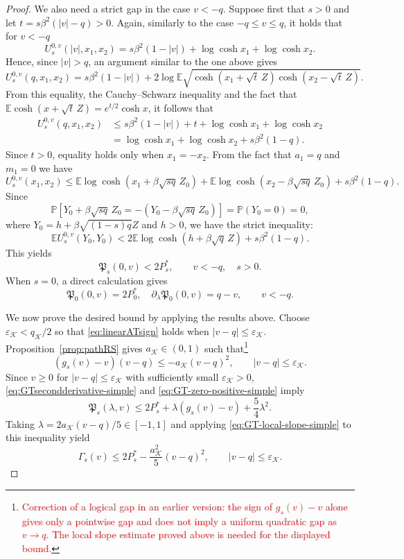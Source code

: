 \documentclass[11pt]{article}
\numberwithin{equation}{section}
\newcommand{\E}{\mathbb{E}}
\newcommand{\Pbb}{\mathbb{P}}
\newcommand{\1}{\mathbf 1}
\newcommand{\cK}{\mathcal K}
\begin{document}
\begin{proof}
We also need a strict gap in  the case $v<-q$.  Suppose first that $s>0$ and let $t=s\beta^2(|v|-q)>0$.
Again, similarly to  the case $-q\le v\le q$, it holds that for $v< -q$
\[
 U_s^{0,v}(|v|,x_1,x_2)
 =s\beta^2(1-|v|)+\log\cosh x_1+\log\cosh x_2.
\]
Hence, since $|v|>q$, an argument similar to the one  above gives  
\[
 U_s^{0,v}(q,x_1,x_2)
 =
 s\beta^2(1-|v|)
 +2\log\E\sqrt{
   \cosh(x_1+\sqrt t\,Z)\cosh(x_2-\sqrt t\,Z)}.
\]
From this equality, the Cauchy--Schwarz inequality and the fact that $\E\cosh(x+\sqrt t\,Z)=e^{t/2}\cosh x$, it follows that
\begin{align*}
 U_s^{0,v}(q,x_1,x_2)
 &\le
 s\beta^2(1-|v|)+t
 +\log\cosh x_1+\log\cosh x_2\\
 &=\log\cosh x_1+\log\cosh x_2 + s\beta^2(1-q).
\end{align*}
Since $t>0$, equality holds only when $x_1=-x_2$.
From the fact that $a_1=q$ and $m_1=0$ we have
\[
U_s^{0,v}(x_1,x_2) \le \E \log\cosh (x_1 +\beta\sqrt{sq}\,Z_0) + \E \log\cosh (x_2-\beta\sqrt{sq}\,Z_0) + s\beta^2(1-q).
\]
Since 
\[
\Pbb \left[ Y_0+\beta\sqrt{sq}\,Z_0 = - (Y_0-\beta\sqrt{sq}\,Z_0 ) \right] =\Pbb(Y_0=0) = 0,
\]
where $Y_0 = h +\beta \sqrt{(1-s)q}Z$ and $h>0$, we have the strict inequality:
\[
\E U_s^{0,v}(Y_0,Y_0) < 2 \E \log\cosh (h +\beta\sqrt{q}\,Z) + s\beta^2(1-q) .
\]
This yields
\begin{equation}
 \mathfrak P_s(0,v)<2P_s^*,
 \qquad v<-q,\quad s>0.
 \label{eq:GT-negative-strict-simple}
\end{equation}
When $s=0$, a direct calculation gives
\begin{equation}
 \mathfrak P_0(0,v)=2P_0^*,
 \quad
 \partial_\lambda\mathfrak P_0(0,v)=q-v, \qquad v<-q.
 \label{eq:GT-szero-simple}
\end{equation}

We now prove the desired bound by applying the results above.
Choose
$\varepsilon_{\cK}<q_{\cK}/2$ so that
\eqref{eq:linearATsign} holds when
$|v-q|\le\varepsilon_{\cK}$.  Proposition~\ref{prop:pathRS} gives
$a_{\cK}\in (0,1)$ such that\footnote{\textcolor{red}{Correction of a logical gap in an earlier version: the sign of $g_s(v)-v$ alone gives only a pointwise gap and does not imply a uniform quadratic gap as $v\to q$.  The local slope estimate proved above is needed for the displayed bound.}}
\begin{equation}
 (g_s(v)-v)(v-q)
 \le-a_{\cK}(v-q)^2,
 \qquad |v-q|\le\varepsilon_{\cK}.
 \label{eq:GT-local-slope-simple}
\end{equation}
Since $v\geq 0$ for $|v-q|\le\varepsilon_{\cK}$ with sufficiently small $\varepsilon_{\cK} >0$, \eqref{eq:GTsecondderivative-simple} and \eqref{eq:GT-zero-positive-simple} imply
\[
 \mathfrak P_s(\lambda,v)
 \le
 2P_s^*+\lambda(g_s(v)-v)
 +\frac{5}4 \lambda^2.
\]
Taking $\lambda=2 a_{\cK}(v-q)/5 \in [-1,1]$ and applying \eqref{eq:GT-local-slope-simple} to this inequality yield
\begin{equation}
 \Gamma_s(v)
 \le
 2P_s^*
 -\frac{a_{\cK}^2}{5}(v-q)^2,
 \qquad |v-q|\le\varepsilon_{\cK}.
 \label{eq:GT-local-coercivity-simple}
\end{equation}


\end{proof}
\end{document}
